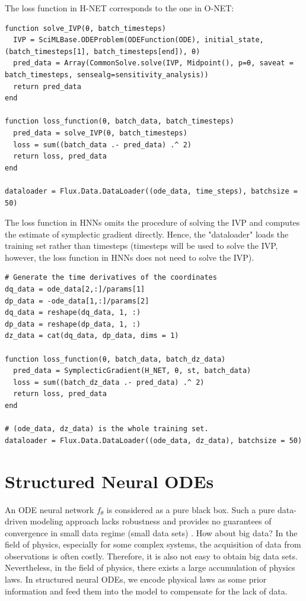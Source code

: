 \documentclass[
	parskip, 			   %
	twoside, 			   %
	DIV=14, 			   %
	BCOR=15.0mm, 		   %
	headsepline, 		   %
	open=right, 		   %
	captions=tableheading, %
	bibliography=totoc,    %
	numbers=noenddot       %
]{scrreprt}
\begin{document}
The loss function in H-NET corresponds to the one in O-NET:

\begin{verbatim}
function solve_IVP(θ, batch_timesteps)
  IVP = SciMLBase.ODEProblem(ODEFunction(ODE), initial_state, (batch_timesteps[1], batch_timesteps[end]), θ)
  pred_data = Array(CommonSolve.solve(IVP, Midpoint(), p=θ, saveat = batch_timesteps, sensealg=sensitivity_analysis))
  return pred_data
end

function loss_function(θ, batch_data, batch_timesteps)
  pred_data = solve_IVP(θ, batch_timesteps)
  loss = sum((batch_data .- pred_data) .^ 2)
  return loss, pred_data
end

dataloader = Flux.Data.DataLoader((ode_data, time_steps), batchsize = 50)
\end{verbatim}

The loss function in HNNs omits the procedure of solving the IVP and computes the estimate of symplectic gradient directly. Hence, the "dataloader" loads the training set rather than timesteps (timesteps will be used to solve the IVP, however, the loss function in HNNs does not need to solve the IVP).

\begin{verbatim}
# Generate the time derivatives of the coordinates
dq_data = ode_data[2,:]/params[1]
dp_data = -ode_data[1,:]/params[2]
dq_data = reshape(dq_data, 1, :)
dp_data = reshape(dp_data, 1, :)
dz_data = cat(dq_data, dp_data, dims = 1)

function loss_function(θ, batch_data, batch_dz_data)
  pred_data = SymplecticGradient(H_NET, θ, st, batch_data)
  loss = sum((batch_dz_data .- pred_data) .^ 2)
  return loss, pred_data
end

# (ode_data, dz_data) is the whole training set.
dataloader = Flux.Data.DataLoader((ode_data, dz_data), batchsize = 50)
\end{verbatim}

\section{Structured Neural ODEs}
An ODE neural network $f_{\theta}$ is considered as a pure black box. Such a pure data-driven modeling approach lacks robustness and provides no guarantees of convergence in small data regime (small data sets) \cite{raissi2017physics}. How about big data? In the field of physics, especially for some complex systems, the acquisition of data from observations is often costly. Therefore, it is also not easy to obtain big data sets. Nevertheless, in the field of physics, there exists a large accumulation of physics laws. In structured neural ODEs, we encode physical laws as some prior information and feed them into the model to compensate for the lack of data.
\end{document}
